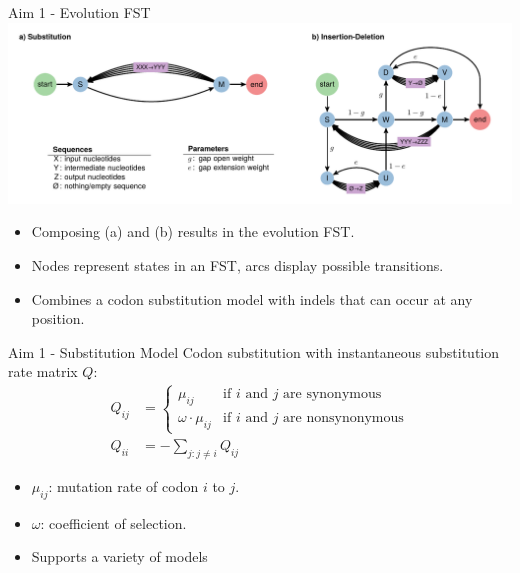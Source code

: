 \documentclass[aspectratio=169]{beamer}
\begin{document}
\begin{frame}{Aim 1 - Evolution FST} %
\includegraphics[scale=0.6,center]{fig-evolution-fst.pdf}
\begin{itemize}
	\item Composing (a) and (b) results in the evolution FST.
	\item Nodes represent states in an FST, arcs display possible transitions.
	\item Combines a codon substitution model with indels that can occur at any
		position.
\end{itemize}
\end{frame} %

\begin{frame}{Aim 1 - Substitution Model} %
Codon substitution with instantaneous substitution rate matrix $Q$:
\vspace{1em}
\begin{align*} Q_{ij} &= \begin{cases}
    \mu_{ij} & \text{if $i$ and $j$ are synonymous}\\
    \omega \cdot \mu_{ij} & \text{if $i$ and $j$ are nonsynonymous}
    \end{cases}\\[10pt]
   Q_{ii} &= -\sum_{j:j \neq i} Q_{ij}
\end{align*}
\begin{itemize}
	\item $\mu_{ij}$: mutation rate of codon $i$ to $j$.
	\item $\omega$: coefficient of selection.
	\item Supports a variety of models %
\end{itemize}
\end{frame} %
\end{document}
